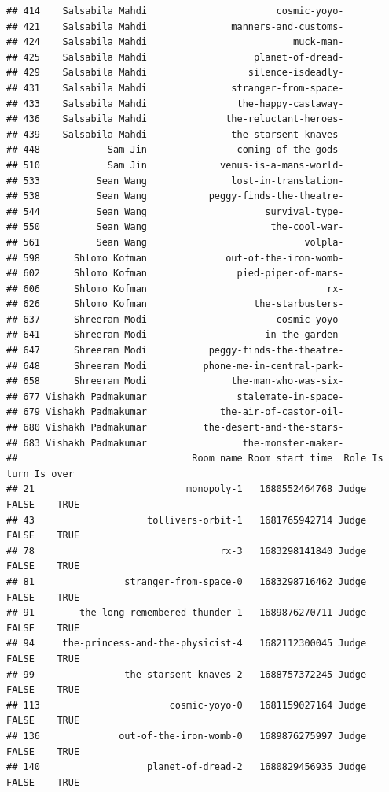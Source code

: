 \documentclass[
]{article}
\begin{document}
\begin{verbatim}
## 414    Salsabila Mahdi                       cosmic-yoyo-
## 421    Salsabila Mahdi               manners-and-customs-
## 424    Salsabila Mahdi                          muck-man-
## 425    Salsabila Mahdi                   planet-of-dread-
## 429    Salsabila Mahdi                  silence-isdeadly-
## 431    Salsabila Mahdi               stranger-from-space-
## 433    Salsabila Mahdi                the-happy-castaway-
## 436    Salsabila Mahdi              the-reluctant-heroes-
## 439    Salsabila Mahdi               the-starsent-knaves-
## 448            Sam Jin                coming-of-the-gods-
## 510            Sam Jin             venus-is-a-mans-world-
## 533          Sean Wang               lost-in-translation-
## 538          Sean Wang           peggy-finds-the-theatre-
## 544          Sean Wang                     survival-type-
## 550          Sean Wang                      the-cool-war-
## 561          Sean Wang                            volpla-
## 598      Shlomo Kofman              out-of-the-iron-womb-
## 602      Shlomo Kofman                pied-piper-of-mars-
## 606      Shlomo Kofman                                rx-
## 626      Shlomo Kofman                   the-starbusters-
## 637      Shreeram Modi                       cosmic-yoyo-
## 641      Shreeram Modi                     in-the-garden-
## 647      Shreeram Modi           peggy-finds-the-theatre-
## 648      Shreeram Modi          phone-me-in-central-park-
## 658      Shreeram Modi               the-man-who-was-six-
## 677 Vishakh Padmakumar                stalemate-in-space-
## 679 Vishakh Padmakumar             the-air-of-castor-oil-
## 680 Vishakh Padmakumar          the-desert-and-the-stars-
## 683 Vishakh Padmakumar                 the-monster-maker-
##                               Room name Room start time  Role Is turn Is over
## 21                           monopoly-1   1680552464768 Judge   FALSE    TRUE
## 43                    tollivers-orbit-1   1681765942714 Judge   FALSE    TRUE
## 78                                 rx-3   1683298141840 Judge   FALSE    TRUE
## 81                stranger-from-space-0   1683298716462 Judge   FALSE    TRUE
## 91        the-long-remembered-thunder-1   1689876270711 Judge   FALSE    TRUE
## 94     the-princess-and-the-physicist-4   1682112300045 Judge   FALSE    TRUE
## 99                the-starsent-knaves-2   1688757372245 Judge   FALSE    TRUE
## 113                       cosmic-yoyo-0   1681159027164 Judge   FALSE    TRUE
## 136              out-of-the-iron-womb-0   1689876275997 Judge   FALSE    TRUE
## 140                   planet-of-dread-2   1680829456935 Judge   FALSE    TRUE

\end{verbatim}
\end{document}
